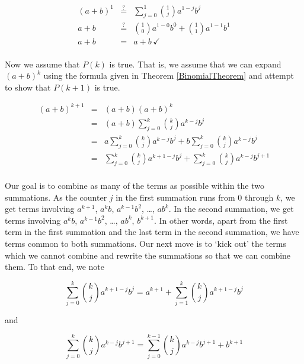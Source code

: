 \[ \begin{array}{rcl}

(a+b)^{1} & \stackrel{?}{=} & \displaystyle{\sum_{j=0}^{1} \binom{1}{j} a^{1-j} b^{j}} \\ [15pt]
a+b & \stackrel{?}{=} & \displaystyle{\binom{1}{0}a^{1-0}b^{0} +  \binom{1}{1}a^{1-1}b^{1}} \\ [15pt]
a+b & = & a + b \, \checkmark \\

\end{array} \]

Now we assume that $P(k)$ is true.  That is, we assume that we can expand $(a+b)^k$ using the formula given in Theorem \ref{BinomialTheorem}  and attempt to show that $P(k+1)$ is true.

\[ \begin{array}{rcl}

(a+b)^{k+1} & = & (a+b)(a+b)^{k} \\ [15pt]
            & = & (a+b) \displaystyle{\sum_{j=0}^{k} \binom{k}{j} a^{k-j} b^{j}}  \\ [15pt]
            & = & a \displaystyle{\sum_{j=0}^{k} \binom{k}{j} a^{k-j} b^{j}} +  b \displaystyle{\sum_{j=0}^{k} \binom{k}{j} a^{k-j} b^{j}} \\ [15pt]
            & = & \displaystyle{\sum_{j=0}^{k} \binom{k}{j} a^{k+1-j} b^{j}} +  \displaystyle{\sum_{j=0}^{k} \binom{k}{j} a^{k-j} b^{j+1}} \\ [15pt]           
            
\end{array} \]

Our goal is to combine as many of the terms as possible within the two summations. As the counter $j$ in the first summation runs from $0$ through $k$, we get terms involving $a^{k+1}$, $a^{k}b$, $a^{k-1}b^2$, \ldots, $ab^{k}$.  In the second summation,   we get terms involving $a^{k}b$, $a^{k-1}b^{2}$, \ldots, $ab^{k}$, $b^{k+1}$.  In other words, apart from the first term in the first summation and the last term in the second summation, we have terms common to both summations.  Our next move is to `kick out' the terms which we cannot combine and rewrite the summations so that we can combine them.  To that end, we note

\[ \displaystyle{\sum_{j=0}^{k} \binom{k}{j} a^{k+1-j} b^{j} = a^{k+1}+ \sum_{j=1}^{k} \binom{k}{j} a^{k+1-j} b^{j}}\]

and

\[ \displaystyle{\sum_{j=0}^{k} \binom{k}{j} a^{k-j} b^{j+1} = \sum_{j=0}^{k-1} \binom{k}{j} a^{k-j} b^{j+1} + b^{k+1}}\]

